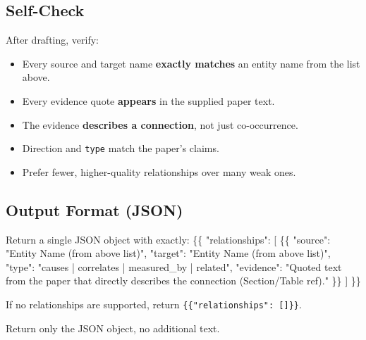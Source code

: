 \begin{tcolorbox}[breakable,enhanced,colback=blue!3,colframe=blue!40!black,title={Prompt},fonttitle=\bfseries,left=8pt,right=8pt,top=6pt,bottom=6pt]
\subsection*{Self-Check}

After drafting, verify:
\begin{itemize}
\item Every source and target name \textbf{exactly matches} an entity name from the list above.
\item Every evidence quote \textbf{appears} in the supplied paper text.
\item The evidence \textbf{describes a connection}, not just co-occurrence.
\item Direction and \texttt{type} match the paper's claims.
\item Prefer fewer, higher-quality relationships over many weak ones.
\end{itemize}

\subsection*{Output Format (JSON)}

Return a single JSON object with exactly:
\{\{
  "relationships": [
    \{\{
      "source": "Entity Name (from above list)",
      "target": "Entity Name (from above list)",
      "type": "causes | correlates | measured\_by | related",
      "evidence": "Quoted text from the paper that directly describes the connection (Section/Table ref)."
    \}\}
  ]
\}\}

If no relationships are supported, return \texttt{\{\{"relationships": []\}\}}.

Return only the JSON object, no additional text.
\end{tcolorbox}

